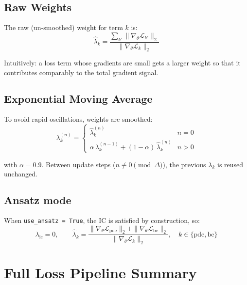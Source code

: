 \documentclass[11pt, a4paper]{article}
\begin{document}
\subsection{Raw Weights}

The raw (un-smoothed) weight for term $k$ is:
\begin{equation}
  \hat{\lambda}_k
  = \frac{\displaystyle\sum_{k'} \|\nabla_\theta \mathcal{L}_{k'}\|_2}
         {\|\nabla_\theta \mathcal{L}_k\|_2}
  \label{eq:raw_weights}
\end{equation}

Intuitively: a loss term whose gradients are small gets a larger weight so
that it contributes comparably to the total gradient signal.

\subsection{Exponential Moving Average}

To avoid rapid oscillations, weights are smoothed:
\begin{equation}
  \lambda_k^{(n)} =
  \begin{cases}
    \hat{\lambda}_k^{(n)} & n = 0 \\
    \alpha\,\lambda_k^{(n-1)} + (1 - \alpha)\,\hat{\lambda}_k^{(n)} & n > 0
  \end{cases}
  \label{eq:ema}
\end{equation}

with $\alpha = 0.9$. Between update steps ($n \not\equiv 0 \pmod{\Delta}$),
the previous $\lambda_k$ is reused unchanged.

\subsection{Ansatz mode}

When \texttt{use\_ansatz = True}, the IC is satisfied by construction, so:
\begin{equation}
  \lambda_{\mathrm{ic}} = 0,
  \qquad
  \hat{\lambda}_k = \frac{\|\nabla_\theta \mathcal{L}_{\mathrm{pde}}\|_2
                         + \|\nabla_\theta \mathcal{L}_{\mathrm{bc}}\|_2}
                        {\|\nabla_\theta \mathcal{L}_k\|_2},
  \quad k \in \{\mathrm{pde}, \mathrm{bc}\}
\end{equation}


\section{Full Loss Pipeline Summary}
\end{document}
